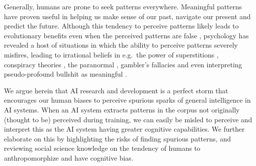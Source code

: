 \documentclass{article}
\theoremstyle{plain}
\theoremstyle{definition}
\theoremstyle{remark}
\begin{document}

Generally, humans are prone to seek patterns everywhere. Meaningful patterns have proven useful in helping us make sense of our past, navigate our present and predict the future. Although this tendency to perceive patterns likely leads to evolutionary benefits even when the perceived patterns are false \cite{foster2009evolution}, psychology has revealed a host of situations in which the ability to perceive patterns severely misfires, leading to irrational beliefs in e.g.\ the power of superstitions \cite{foster2009evolution}, conspiracy theories \cite{van2018connecting}, the paranormal \cite{muller2023linking}, gambler's fallacies \cite{ladouceur1996erroneous} and even interpreting pseudo-profound bullshit as meaningful \cite{walker2019finding}. 

We argue herein that AI research and development is a perfect storm that encourages our human biases to perceive spurious sparks of general intelligence in AI systems. When an AI system extracts patterns in the corpus not originally (thought to be) perceived during training, we can easily be misled to perceive and interpret this as the AI system having greater cognitive capabilities. We further elaborate on this by highlighting the risks of finding spurious patterns, and reviewing social science knowledge on the tendency of humans to anthropomorphize and have cognitive bias.
\end{document}
